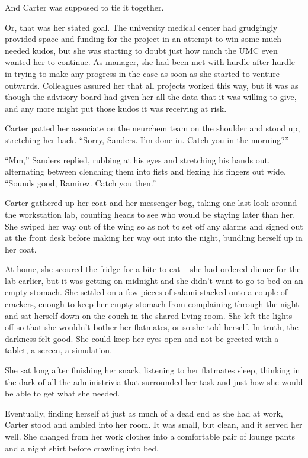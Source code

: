 And Carter was supposed to tie it together.

Or, that was her stated goal. The university medical center had grudgingly provided space and funding for the project in an attempt to win some much-needed kudos, but she was starting to doubt just how much the UMC even wanted her to continue. As manager, she had been met with hurdle after hurdle in trying to make any progress in the case as soon as she started to venture outwards. Colleagues assured her that all projects worked this way, but it was as though the advisory board had given her all the data that it was willing to give, and any more might put those kudos it was receiving at risk.

Carter patted her associate on the neurchem team on the shoulder and stood up, stretching her back. ``Sorry, Sanders. I'm done in. Catch you in the morning?''

``Mm,'' Sanders replied, rubbing at his eyes and stretching his hands out, alternating between clenching them into fists and flexing his fingers out wide. ``Sounds good, Ramirez. Catch you then.''

Carter gathered up her coat and her messenger bag, taking one last look around the workstation lab, counting heads to see who would be staying later than her. She swiped her way out of the wing so as not to set off any alarms and signed out at the front desk before making her way out into the night, bundling herself up in her coat.

At home, she scoured the fridge for a bite to eat -- she had ordered dinner for the lab earlier, but it was getting on midnight and she didn't want to go to bed on an empty stomach. She settled on a few pieces of salami stacked onto a couple of crackers, enough to keep her empty stomach from complaining through the night and sat herself down on the couch in the shared living room. She left the lights off so that she wouldn't bother her flatmates, or so she told herself. In truth, the darkness felt good. She could keep her eyes open and not be greeted with a tablet, a screen, a simulation.

She sat long after finishing her snack, listening to her flatmates sleep, thinking in the dark of all the administrivia that surrounded her task and just how she would be able to get what she needed.

Eventually, finding herself at just as much of a dead end as she had at work, Carter stood and ambled into her room. It was small, but clean, and it served her well. She changed from her work clothes into a comfortable pair of lounge pants and a night shirt before crawling into bed.

